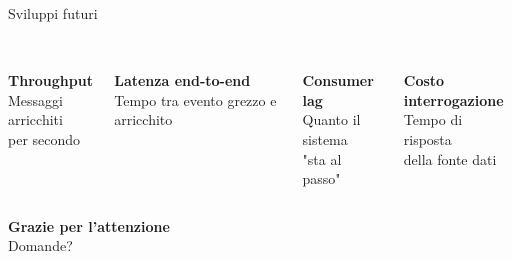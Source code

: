 \documentclass[11pt,aspectratio=169]{beamer}
\begin{document}
\begin{frame}{Sviluppi futuri}
    \begin{columns}[t]
        \begin{center}
            {\Large\textcolor{red_unipd}{}}\\[4pt]
            \textbf{Throughput}\\
            \small Messaggi arricchiti \\per secondo
        \end{center}
        \vspace{14pt}
        \begin{center}
            {\Large\textcolor{red_unipd}{}}\\[4pt]
            \textbf{Latenza end-to-end}\\
            \small Tempo tra evento grezzo e arricchito
        \end{center}
        \begin{center}
            {\Large\textcolor{red_unipd}{}}\\[4pt]
            \textbf{Consumer lag}\\
            \small Quanto il sistema \\"sta al passo"
        \end{center}
        \vspace{14pt}
        \begin{center}
            {\Large\textcolor{red_unipd}{}}\\[4pt]
            \textbf{Costo interrogazione}\\
            \small Tempo di risposta \\della fonte dati
        \end{center}
    \end{columns}
\end{frame}

\begin{frame}
    \begin{center}
        {\Huge \textbf{Grazie per l'attenzione}}\\[25pt]
        {\Large Domande?}
    \end{center}
\end{frame}
\end{document}
